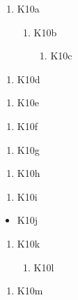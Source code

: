 \documentclass[10pt]{article}
\newlength{\mylen}
\newlength{\fixlen}
\begin{document}
\begin{enumerate}[label=\arabic*.]
\item K10a
\begin{enumerate}[label=(\alph*)]
\item K10b
\begin{enumerate}[label=\roman*.,itemsep=0pt]
\item K10c
\end{enumerate}
\end{enumerate}
\end{enumerate}
\begin{enumerate}[labelsep=1em]
\item K10d
\end{enumerate}
\begin{enumerate}[itemindent=1em]
\item K10e
\end{enumerate}
\begin{enumerate}[label=\roman*.,leftmargin=*,widest=iii]
\item K10f
\end{enumerate}
\begin{enumerate}[leftmargin=\mylen]
\item K10g
\end{enumerate}
\begin{enumerate}[leftmargin=*,labelsep=1em]
\item K10h
\end{enumerate}
\begin{enumerate}[leftmargin=*,itemindent=6pt]
\item K10i
\end{enumerate}
\begin{itemize}[leftmargin=*,widest=WW]
\item K10j
\end{itemize}
\begin{enumerate}[leftmargin=*,labelsep=2em]
\item K10k
\begin{enumerate}[leftmargin=*]
\item K10l
\end{enumerate}
\end{enumerate}
\begin{enumerate}[leftmargin=\fixlen]
\item K10m
\end{enumerate}
\end{document}
